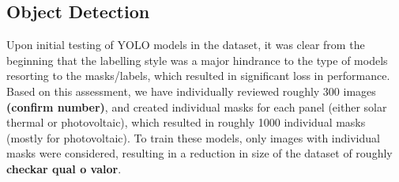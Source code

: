 \documentclass[conference]{IEEEtran}
\begin{document}
\subsection{Object Detection}


Upon initial testing of YOLO models in the dataset, it was clear from the beginning that the labelling style was a major hindrance to the type of models resorting to the masks/labels, which resulted in significant loss in performance. Based on this assessment, we have individually reviewed roughly 300 images \textbf{(confirm number)}, and created individual masks for each panel (either solar thermal or photovoltaic), which resulted in roughly 1000 individual masks (mostly for photovoltaic). To train these models, only images with individual masks were considered, resulting in a reduction in size of the dataset of roughly \textbf{checkar qual o valor}.

\end{document}
